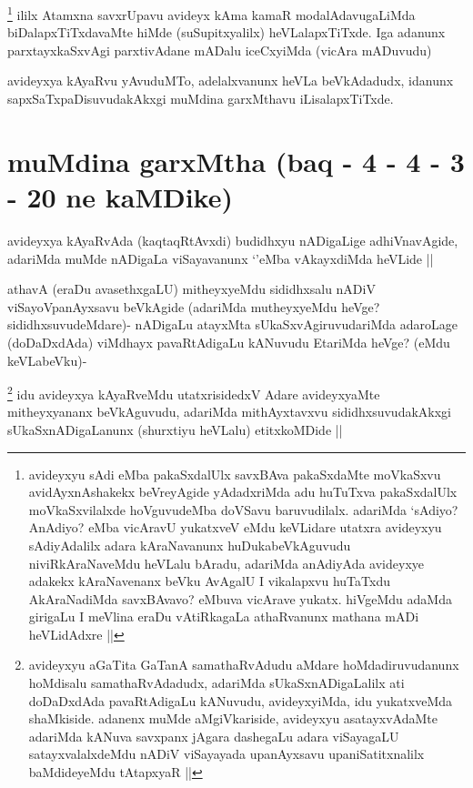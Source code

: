 \begin{artha}
\footnote{avideyxyu sAdi eMba pakaSxdalUlx savxBAva pakaSxdaMte moVkaSxvu avidAyxnAshakekx beVreyAgide yAdadxriMda adu huTuTxva pakaSxdalUlx moVkaSxvilalxde hoVguvudeMba doVSavu baruvudilalx. adariMda `sAdiyo? AnAdiyo? eMba vicAravU yukatxveV eMdu keVLidare utatxra avideyxyu sAdiyAdalilx adara kAraNavanunx huDukabeVkAguvudu niviRkAraNaveMdu heVLalu bAradu, adariMda anAdiyAda avideyxye adakekx kAraNavenanx beVku AvAgalU I vikalapxvu huTaTxdu AkAraNadiMda savxBAvavo? eMbuva vicArave yukatx. hiVgeMdu adaMda girigaLu I meVlina eraDu vAtiRkagaLa athaRvanunx mathana mADi heVLidAdxre ||}
ililx Atamxna savxrUpavu avideyx kAma kamaR modalAdavugaLiMda biDalapxTiTxdavaMte hiMde (suSupitxyalilx) heVLalapxTiTxde. Iga adanunx parxtayxkaSxvAgi parxtivAdane mADalu iceCxyiMda (vicAra mADuvudu)
\end{artha}

\begin{artha}
avideyxya kAyaRvu yAvuduMTo, adelalxvanunx heVLa beVkAdadudx, idanunx sapxSaTxpaDisuvudakAkxgi muMdina garxMthavu iLisalapxTiTxde.
\end{artha}

\section*{muMdina garxMtha (baq - 4 - 4 - 3 - 20 ne kaMDike)}


\begin{artha}
avideyxya kAyaRvAda (kaqtaqRtAvxdi) budidhxyu nADigaLige adhiVnavAgide, adariMda muMde nADigaLa viSayavanunx `\stext'eMba vAkayxdiMda heVLide ||
\end{artha}


\begin{artha}
athavA (eraDu avasethxgaLU) mitheyxyeMdu sididhxsalu nADiV viSayoVpanAyxsavu beVkAgide (adariMda mutheyxyeMdu heVge? sididhxsuvudeMdare)- nADigaLu atayxMta sUkaSxvAgiruvudariMda adaroLage (doDaDxdAda) viMdhayx pavaRtAdigaLu kANuvudu EtariMda heVge? (eMdu keVLabeVku)-
\end{artha}

\begin{artha}
\footnote{avideyxyu aGaTita GaTanA samathaRvAdudu aMdare hoMdadiruvudanunx hoMdisalu samathaRvAdadudx, adariMda sUkaSxnADigaLalilx ati doDaDxdAda pavaRtAdigaLu kANuvudu, avideyxyiMda, idu yukatxveMda shaMkiside. adanenx muMde aMgiVkariside, avideyxyu asatayxvAdaMte adariMda kANuva savxpanx jAgara dashegaLu adara viSayagaLU satayxvalalxdeMdu nADiV viSayayada upanAyxsavu upaniSatitxnalilx baMdideyeMdu tAtapxyaR ||}
idu avideyxya kAyaRveMdu utatxrisidedxV Adare avideyxyaMte mitheyxyananx beVkAguvudu, adariMda mithAyxtavxvu sididhxsuvudakAkxgi sUkaSxnADigaLanunx (shurxtiyu heVLalu) etitxkoMDide ||
\end{artha}


